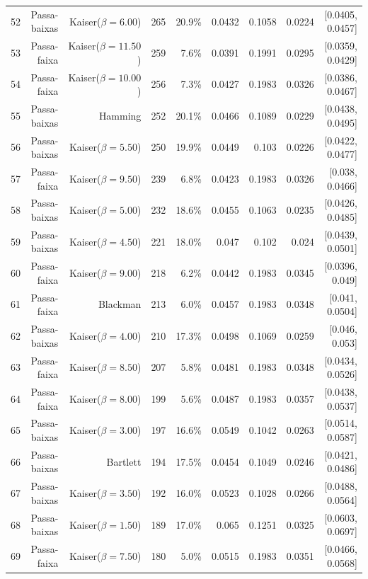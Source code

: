 \begin{longtable}{lrrrrrrrr}
    52 & Passa-baixas & Kaiser($\beta=6.00$) & 265 & 20.9\% & 0.0432 & 0.1058 & 0.0224 & [0.0405, 0.0457] \\
    53 & Passa-faixa & Kaiser($\beta=11.50$) & 259 & 7.6\% & 0.0391 & 0.1991 & 0.0295 & [0.0359, 0.0429] \\
    54 & Passa-faixa & Kaiser($\beta=10.00$) & 256 & 7.3\% & 0.0427 & 0.1983 & 0.0326 & [0.0386, 0.0467] \\
    55 & Passa-baixas & Hamming & 252 & 20.1\% & 0.0466 & 0.1089 & 0.0229 & [0.0438, 0.0495] \\
    56 & Passa-baixas & Kaiser($\beta=5.50$) & 250 & 19.9\% & 0.0449 & 0.103 & 0.0226 & [0.0422, 0.0477] \\
    57 & Passa-faixa & Kaiser($\beta=9.50$) & 239 & 6.8\% & 0.0423 & 0.1983 & 0.0326 & [0.038, 0.0466] \\
    58 & Passa-baixas & Kaiser($\beta=5.00$) & 232 & 18.6\% & 0.0455 & 0.1063 & 0.0235 & [0.0426, 0.0485] \\
    59 & Passa-baixas & Kaiser($\beta=4.50$) & 221 & 18.0\% & 0.047 & 0.102 & 0.024 & [0.0439, 0.0501] \\
    60 & Passa-faixa & Kaiser($\beta=9.00$) & 218 & 6.2\% & 0.0442 & 0.1983 & 0.0345 & [0.0396, 0.049] \\
    61 & Passa-faixa & Blackman & 213 & 6.0\% & 0.0457 & 0.1983 & 0.0348 & [0.041, 0.0504] \\
    62 & Passa-baixas & Kaiser($\beta=4.00$) & 210 & 17.3\% & 0.0498 & 0.1069 & 0.0259 & [0.046, 0.053] \\
    63 & Passa-faixa & Kaiser($\beta=8.50$) & 207 & 5.8\% & 0.0481 & 0.1983 & 0.0348 & [0.0434, 0.0526] \\
    64 & Passa-faixa & Kaiser($\beta=8.00$) & 199 & 5.6\% & 0.0487 & 0.1983 & 0.0357 & [0.0438, 0.0537] \\
    65 & Passa-baixas & Kaiser($\beta=3.00$) & 197 & 16.6\% & 0.0549 & 0.1042 & 0.0263 & [0.0514, 0.0587] \\
    66 & Passa-baixas & Bartlett & 194 & 17.5\% & 0.0454 & 0.1049 & 0.0246 & [0.0421, 0.0486] \\
    67 & Passa-baixas & Kaiser($\beta=3.50$) & 192 & 16.0\% & 0.0523 & 0.1028 & 0.0266 & [0.0488, 0.0564] \\
    68 & Passa-baixas & Kaiser($\beta=1.50$) & 189 & 17.0\% & 0.065 & 0.1251 & 0.0325 & [0.0603, 0.0697] \\
    69 & Passa-faixa & Kaiser($\beta=7.50$) & 180 & 5.0\% & 0.0515 & 0.1983 & 0.0351 & [0.0466, 0.0568] \\

\end{longtable}
